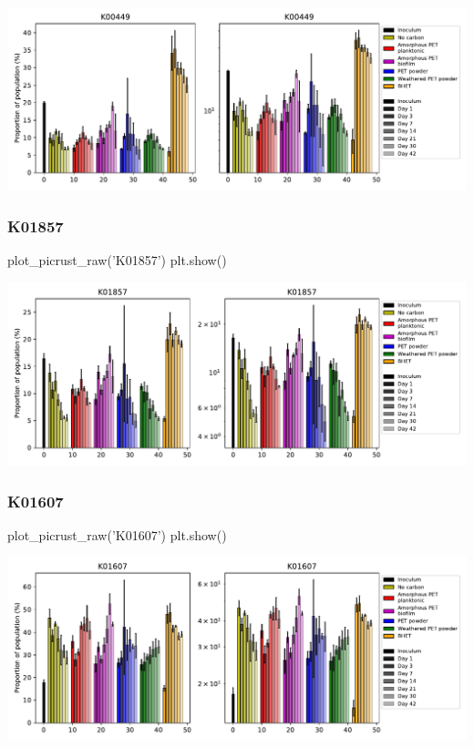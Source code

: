 \documentclass[
]{article}
\newenvironment{Shaded}{\begin{snugshade}}{\end{snugshade}}
\newcommand{\NormalTok}[1]{#1}
\newcommand{\StringTok}[1]{\textcolor[rgb]{0.31,0.60,0.02}{#1}}
\begin{document}
\includegraphics{20-6-15-PET-plastisphere-PICRUSt2_files/figure-latex/plot_raw_K00449-1.pdf}

\hypertarget{k01857}{%
\subsubsection{K01857}\label{k01857}}

\begin{Shaded}
\begin{Highlighting}[]
\NormalTok{plot_picrust_raw(}\StringTok{'K01857'}\NormalTok{)}
\NormalTok{plt.show()}
\end{Highlighting}
\end{Shaded}

\includegraphics{20-6-15-PET-plastisphere-PICRUSt2_files/figure-latex/plot_raw_K01857-1.pdf}

\hypertarget{k01607}{%
\subsubsection{K01607}\label{k01607}}

\begin{Shaded}
\begin{Highlighting}[]
\NormalTok{plot_picrust_raw(}\StringTok{'K01607'}\NormalTok{)}
\NormalTok{plt.show()}
\end{Highlighting}
\end{Shaded}

\includegraphics{20-6-15-PET-plastisphere-PICRUSt2_files/figure-latex/plot_raw_K01607-1.pdf}
\end{document}

